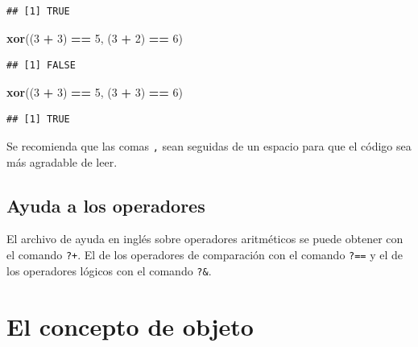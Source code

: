 \documentclass[]{book}
\makeatletter
\newenvironment{Shaded}{\begin{snugshade}}{\end{snugshade}}
\newcommand{\KeywordTok}[1]{\textcolor[rgb]{0.13,0.29,0.53}{\textbf{#1}}}
\newcommand{\DecValTok}[1]{\textcolor[rgb]{0.00,0.00,0.81}{#1}}
\newcommand{\StringTok}[1]{\textcolor[rgb]{0.31,0.60,0.02}{#1}}
\newcommand{\OperatorTok}[1]{\textcolor[rgb]{0.81,0.36,0.00}{\textbf{#1}}}
\newcommand{\NormalTok}[1]{#1}
\newenvironment{kframe}{%
\medskip{}
\setlength{\fboxsep}{.8em}
 \def\at@end@of@kframe{}%
 \ifinner\ifhmode%
  \def\at@end@of@kframe{\end{minipage}}%
  \begin{minipage}{\columnwidth}%
 \fi\fi%
 \def\FrameCommand##1{\hskip\@totalleftmargin \hskip-\fboxsep
 \colorbox{shadecolor}{##1}\hskip-\fboxsep
     \hskip-\linewidth \hskip-\@totalleftmargin \hskip\columnwidth}%
 \MakeFramed {\advance\hsize-\width
   \@totalleftmargin\z@ \linewidth\hsize
   \@setminipage}}%
 {\par\unskip\endMakeFramed%
 \at@end@of@kframe}
\newenvironment{rmdblock}[1]
  {
  \begin{itemize}
  \renewcommand{\labelitemi}{
    \raisebox{-.7\height}[0pt][0pt]{
      {\setkeys{Gin}{width=3em,keepaspectratio}\texttt{[image: myIcons/\#1]}} %
    }
  }
  \setlength{\fboxsep}{1em}
  \begin{kframe}
  \item
  }
  {
  \end{kframe}
  \end{itemize}
  }
\newenvironment{rmdstyle}     %
  {\begin{rmdblock}{style}}   %
  {\end{rmdblock}}            %
\makeatother
\begin{document}
\begin{verbatim}
## [1] TRUE
\end{verbatim}

\begin{Shaded}
\begin{Highlighting}[]
\KeywordTok{xor}\NormalTok{((}\DecValTok{3} \OperatorTok{+}\StringTok{ }\DecValTok{3}\NormalTok{) }\OperatorTok{==}\StringTok{ }\DecValTok{5}\NormalTok{, (}\DecValTok{3} \OperatorTok{+}\StringTok{ }\DecValTok{2}\NormalTok{) }\OperatorTok{==}\StringTok{ }\DecValTok{6}\NormalTok{)}
\end{Highlighting}
\end{Shaded}

\begin{verbatim}
## [1] FALSE
\end{verbatim}

\begin{Shaded}
\begin{Highlighting}[]
\KeywordTok{xor}\NormalTok{((}\DecValTok{3} \OperatorTok{+}\StringTok{ }\DecValTok{3}\NormalTok{) }\OperatorTok{==}\StringTok{ }\DecValTok{5}\NormalTok{, (}\DecValTok{3} \OperatorTok{+}\StringTok{ }\DecValTok{3}\NormalTok{) }\OperatorTok{==}\StringTok{ }\DecValTok{6}\NormalTok{)}
\end{Highlighting}
\end{Shaded}

\begin{verbatim}
## [1] TRUE
\end{verbatim}

\begin{rmdstyle}
Se recomienda que las comas \texttt{,} sean seguidas de un espacio para
que el código sea más agradable de leer.
\end{rmdstyle}

\subsection{Ayuda a los operadores}\label{ayuda-a-los-operadores}

El archivo de ayuda en inglés sobre operadores aritméticos se puede
obtener con el comando \texttt{?\textquotesingle{}+\textquotesingle{}}.
El de los operadores de comparación con el comando
\texttt{?\textquotesingle{}==\textquotesingle{}} y el de los operadores
lógicos con el comando \texttt{?\textquotesingle{}\&\textquotesingle{}}.

\section{El concepto de objeto}\label{el-concepto-de-objeto}
\end{document}
